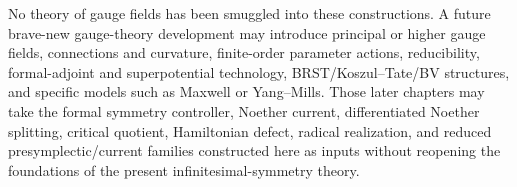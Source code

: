 No theory of gauge fields has been smuggled into these constructions.  A future
brave-new gauge-theory development may introduce principal or higher gauge fields,
connections and curvature, finite-order parameter actions, reducibility,
formal-adjoint and superpotential technology, BRST/Koszul--Tate/BV structures, and
specific models such as Maxwell or Yang--Mills.  Those later chapters may take the
formal symmetry controller, Noether current, differentiated Noether splitting,
critical quotient, Hamiltonian defect, radical realization, and reduced
presymplectic/current families constructed here as inputs without reopening the
foundations of the present infinitesimal-symmetry theory.
